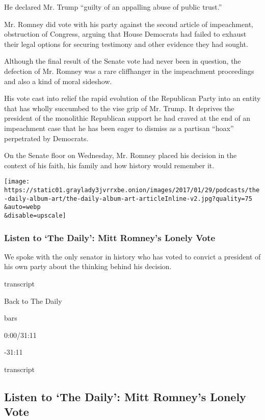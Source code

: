 He declared Mr. Trump ``guilty of an appalling abuse of public trust.''

Mr. Romney did vote with his party against the second article of
impeachment, obstruction of Congress, arguing that House Democrats had
failed to exhaust their legal options for securing testimony and other
evidence they had sought.

Although the final result of the Senate vote had never been in question,
the defection of Mr. Romney was a rare cliffhanger in the impeachment
proceedings and also a kind of moral sideshow.

His vote cast into relief the rapid evolution of the Republican Party
into an entity that has wholly succumbed to the vise grip of Mr. Trump.
It deprives the president of the monolithic Republican support he had
craved at the end of an impeachment case that he has been eager to
dismiss as a partisan ``hoax'' perpetrated by Democrats.

On the Senate floor on Wednesday, Mr. Romney placed his decision in the
context of his faith, his family and how history would remember it.

\texttt{[image: https://static01.graylady3jvrrxbe.onion/images/2017/01/29/podcasts/the-daily-album-art/the-daily-album-art-articleInline-v2.jpg?quality=75\\\&auto=webp\\\&disable=upscale]}

\hypertarget{listen-to-the-daily-mitt-romneys-lonely-vote}{%
\subsubsection{Listen to `The Daily': Mitt Romney's Lonely
Vote}\label{listen-to-the-daily-mitt-romneys-lonely-vote}}

We spoke with the only senator in history who has voted to convict a
president of his own party about the thinking behind his decision.

transcript

Back to The Daily

bars

0:00/31:11

-31:11

transcript

\hypertarget{listen-to-the-daily-mitt-romneys-lonely-vote-1}{%
\subsection{Listen to `The Daily': Mitt Romney's Lonely
Vote}\label{listen-to-the-daily-mitt-romneys-lonely-vote-1}}

